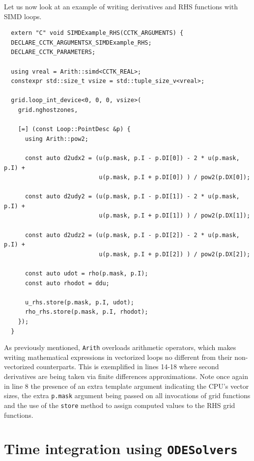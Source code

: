 Let us now look at an example of writing derivatives and RHS functions with SIMD loops.

\begin{verbatim}
  extern "C" void SIMDExample_RHS(CCTK_ARGUMENTS) {
  DECLARE_CCTK_ARGUMENTSX_SIMDExample_RHS;
  DECLARE_CCTK_PARAMETERS;

  using vreal = Arith::simd<CCTK_REAL>;
  constexpr std::size_t vsize = std::tuple_size_v<vreal>;

  grid.loop_int_device<0, 0, 0, vsize>(
    grid.nghostzones,
    
    [=] (const Loop::PointDesc &p) {
      using Arith::pow2;

      const auto d2udx2 = (u(p.mask, p.I - p.DI[0]) - 2 * u(p.mask, p.I) +
                           u(p.mask, p.I + p.DI[0]) ) / pow2(p.DX[0]);
      
      const auto d2udy2 = (u(p.mask, p.I - p.DI[1]) - 2 * u(p.mask, p.I) +
                           u(p.mask, p.I + p.DI[1]) ) / pow2(p.DX[1]);
      
      const auto d2udz2 = (u(p.mask, p.I - p.DI[2]) - 2 * u(p.mask, p.I) +
                           u(p.mask, p.I + p.DI[2]) ) / pow2(p.DX[2]);

      const auto udot = rho(p.mask, p.I);
      const auto rhodot = ddu;

      u_rhs.store(p.mask, p.I, udot);
      rho_rhs.store(p.mask, p.I, rhodot);
    });
  }
\end{verbatim}

As previously mentioned, \texttt{Arith} overloads arithmetic operators, which makes writing mathematical expressions in vectorized loops no different from their non-vectorized counterparts. This is exemplified in lines 14-18 where second derivatives are being taken via finite differences approximations. Note once again in line 8 the presence of an extra template argument indicating the CPU's vector sizes, the extra \texttt{p.mask} argument being passed on all invocations of grid functions and the use of the \texttt{store} method to assign computed values to the RHS grid functions.


\section{Time integration using \texttt{ODESolvers}}
\label{sec:odesolvers}

